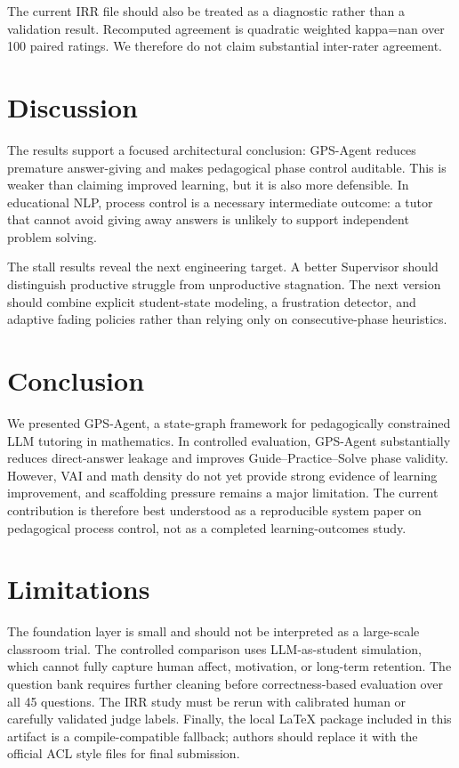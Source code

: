 \documentclass[11pt]{article}
\begin{document}
The current IRR file should also be treated as a diagnostic rather than a validation result. Recomputed agreement is quadratic weighted kappa=nan over 100 paired ratings. We therefore do not claim substantial inter-rater agreement.

\section{Discussion}
The results support a focused architectural conclusion: GPS-Agent reduces premature answer-giving and makes pedagogical phase control auditable. This is weaker than claiming improved learning, but it is also more defensible. In educational NLP, process control is a necessary intermediate outcome: a tutor that cannot avoid giving away answers is unlikely to support independent problem solving.

The stall results reveal the next engineering target. A better Supervisor should distinguish productive struggle from unproductive stagnation. The next version should combine explicit student-state modeling, a frustration detector, and adaptive fading policies rather than relying only on consecutive-phase heuristics.

\section{Conclusion}
We presented GPS-Agent, a state-graph framework for pedagogically constrained LLM tutoring in mathematics. In controlled evaluation, GPS-Agent substantially reduces direct-answer leakage and improves Guide--Practice--Solve phase validity. However, VAI and math density do not yet provide strong evidence of learning improvement, and scaffolding pressure remains a major limitation. The current contribution is therefore best understood as a reproducible system paper on pedagogical process control, not as a completed learning-outcomes study.

\section{Limitations}
The foundation layer is small and should not be interpreted as a large-scale classroom trial. The controlled comparison uses LLM-as-student simulation, which cannot fully capture human affect, motivation, or long-term retention. The question bank requires further cleaning before correctness-based evaluation over all 45 questions. The IRR study must be rerun with calibrated human or carefully validated judge labels. Finally, the local LaTeX package included in this artifact is a compile-compatible fallback; authors should replace it with the official ACL style files for final submission.
\end{document}
